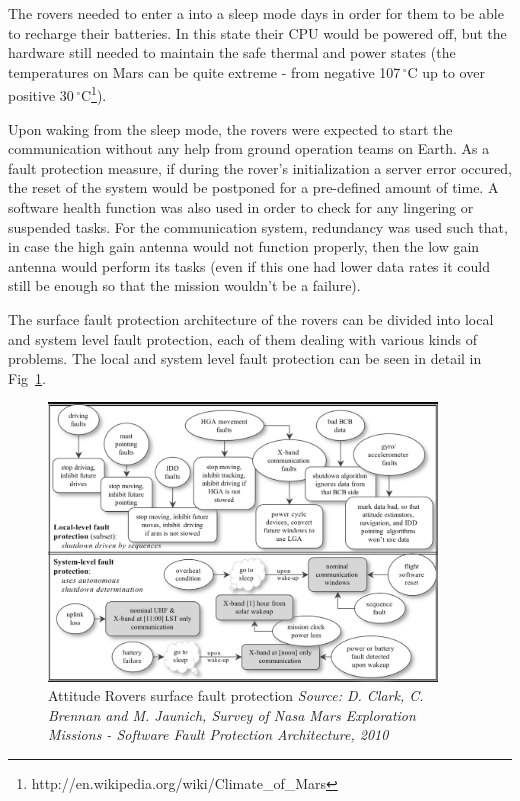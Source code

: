 The rovers needed to enter a into a sleep mode days in order for them to be able
to recharge their batteries. In this state their CPU would be powered off, but
the hardware still needed to maintain the safe thermal and power states (the
temperatures on Mars can be quite extreme - from negative
107$\,^{\circ}\mathrm{C}$ up to over positive
30$\,^{\circ}\mathrm{C}$\footnote{http://en.wikipedia.org/wiki/Climate\_of\_Mars}).

Upon waking from the sleep mode, the rovers were expected to start the
communication without any help from ground operation teams on Earth. As a fault
protection measure, if during the rover's initialization a server error occured,
the reset of the system would be postponed for a pre-defined amount of time. A
software health function was also used in order to check for any lingering or
suspended tasks. For the communication system, redundancy was used such that, in
case the high gain antenna would not function properly, then the low gain
antenna would perform its tasks (even if this one had lower data rates it could
still be enough so that the mission wouldn't be a failure).

The surface fault protection architecture of the rovers can be divided into
local and system level fault protection, each of them dealing with various kinds of
problems. The local and system level fault protection can be seen in detail in
Fig~\ref{fig:rovers}.
\cite{fprot}

\begin{figure}[htb]
	\begin{center}
	\includegraphics[width=0.92\textwidth]{img/rovers.png}
	\caption{Attitude Rovers surface fault protection\small{\textit{ Source: D.
	Clark, C. Brennan and M. Jaunich, Survey of Nasa Mars Exploration Missions -
	Software Fault Protection Architecture, 2010}}}
	\label{fig:rovers}
	\end{center}
\end{figure}

